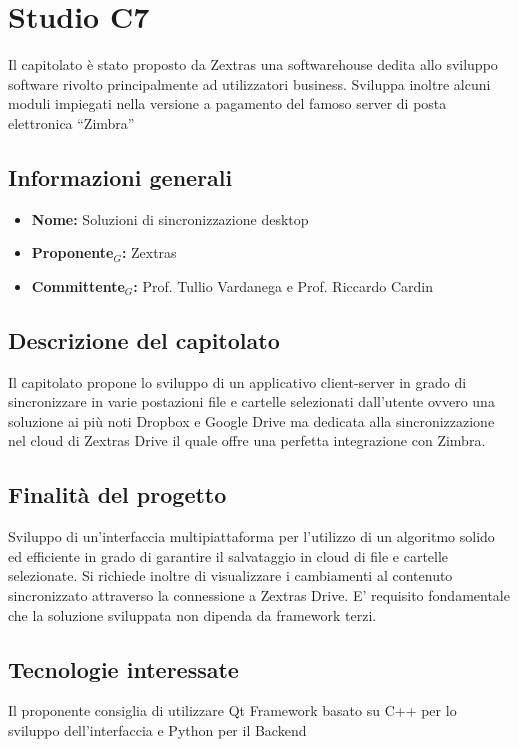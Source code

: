 \section{Studio C7}

Il capitolato è stato proposto da Zextras una softwarehouse dedita allo sviluppo software rivolto principalmente ad utilizzatori business.
Sviluppa inoltre alcuni moduli impiegati nella versione a pagamento del famoso server di posta elettronica “Zimbra”

\subsection{Informazioni generali}
\begin{itemize}
	\item \textbf{Nome:} Soluzioni di sincronizzazione desktop
	\item \textbf{Proponente$_G$:} Zextras
	\item \textbf{Committente$_G$:} Prof. Tullio Vardanega e Prof. Riccardo Cardin
\end{itemize}

\subsection{Descrizione del capitolato}
Il capitolato propone lo sviluppo di un applicativo client-server in grado di sincronizzare in varie postazioni file e cartelle selezionati dall’utente ovvero una soluzione ai più noti Dropbox e Google Drive ma dedicata alla sincronizzazione nel cloud di Zextras Drive il quale offre una perfetta integrazione con Zimbra.

\subsection{Finalità del progetto}
Sviluppo di un’interfaccia multipiattaforma per l’utilizzo di un algoritmo solido ed efficiente in grado di garantire il salvataggio in cloud di file e cartelle selezionate.
Si richiede inoltre di visualizzare i cambiamenti al contenuto sincronizzato attraverso la connessione a Zextras Drive. E’ requisito fondamentale che la soluzione sviluppata non dipenda da framework terzi.


\subsection{Tecnologie interessate}
Il proponente consiglia di utilizzare Qt Framework basato su C++ per lo sviluppo dell’interfaccia e Python per il Backend

